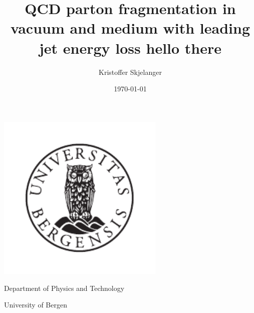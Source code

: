 \documentclass{article}
\title{\Huge{QCD parton fragmentation in vacuum and medium with leading jet energy loss} 
        \endgraf 
        \Large{hello there}}
\author{Kristoffer Skjelanger}
\date{\today}
\begin{document}
    \begin{titlepage}
    \maketitle
    \thispagestyle{empty}
    \vspace*{\fill}
    \begin{center}
        \includegraphics[width=8cm]{pictures/UiB-emblem_gray.pdf}
        \vspace*{\fill}
        
        \Large{Department of Physics and Technology

        University of Bergen}
    \end{center}
    \vfill
    
    \newpage
    \tableofcontents    
    \thispagestyle{empty}
    \end{titlepage}

    \clearpage
        
    \clearpage   
        
    \clearpage
        
    \clearpage
        
    \clearpage
        

    \appendix
    \begin{appendices}
        \clearpage
            
        \clearpage
            
    \end{appendices}
        
    \clearpage
    
    
\end{document}
